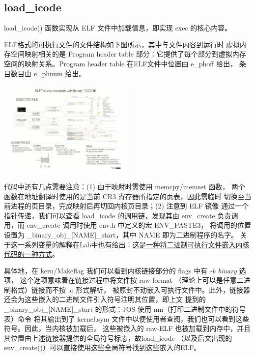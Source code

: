\documentclass[12pt, letterpaper]{report}
\begin{document}
\subsection{\large load\_icode}
load\_icode() 函数实现从 ELF 文件中加载信息，即实现 exec 的核心内容。\par
ELF格式的\underline{可执行文件}的文件结构如下图所示，其中与文件内容到运行时
虚拟内存空间映射相关的是 Program header table 部分：它提供了每个部分到虚拟内存
空间的映射关系。Program header table 在ELF文件中位置由 e\_phoff 给出，
条目数目由 e\_phnum 给出。\par
\quad \par 
{
\centering
\includegraphics[width=0.5\textwidth]{ELF} \par
}
\quad \par 
代码中还有几点需要注意：(1) 由于映射时需使用 memcpy/memset 函数，
两个函数在地址翻译时使用的是当前 CR3 寄存器所指定的页表，因此需临时
切换至当前进程的页目录，完成映射后再切回内核页目录；(2) 注意到 ELF 镜像
通过一个指针传递，我们可以查看 load\_icode 的调用链，发现其由 env\_create 
负责调用，而 env\_create 调用时使用 env.h 中定义的宏 ENV\_PASTE3，
将调用的位置设置为 \_binary\_obj\_[NAME]\_start，其中 NAME 即为二进制程序的名字。
关于这一系列变量的解释在Lab中也有给出：\underline{这是一种将二进制可执行文件嵌入内核代码的一种方式}。\par
具体地，在 kern/Makeflag 我们可以看到内核链接部分的 flags 中有 \textsl{-b binary} 选项，
这个选项意味着在链接过程中将文件按 raw-format （理论上可以是任意二进制格式）链接而不按 .o 形式解析，
被原封不动嵌入可执行文件中。此外，链接器还会为这些嵌入的二进制文件引入符号注明其位置，即上文
提到的 \_binary\_obj\_[NAME]\_start 的形式：JOS 使用 nm（打印二进制文件中的符号表）命令
将其输出到了 kernel.sym 文件中以便使用者查阅，我们也可以看到这些符号。因此，当内核被加载后，
这些被嵌入的 raw-ELF 也被加载到内存中，并且其位置由上述链接器提供的全局符号标志，故load\_icode
（以及后文出现的env\_create()）可以直接使用这些全局符号找到这些嵌入的ELF。
\end{document}
